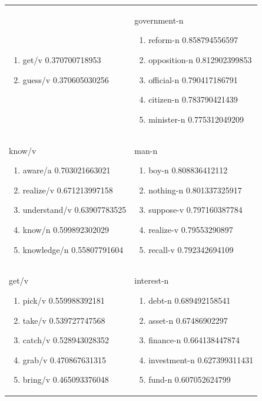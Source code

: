 \documentclass[12pt]{article}
\begin{document}
\begin{longtable}{ p{7cm} | p{7cm} }
\begin{enumerate}
			\item get/v 0.370700718953
			\item guess/v 0.370605030256
		\end{enumerate} &
		government-n
		\begin{enumerate}
			\item reform-n 0.858794556597
			\item opposition-n 0.812902399853
			\item official-n 0.790417186791
			\item citizen-n 0.783790421439
			\item minister-n 0.775312049209
		\end{enumerate}
		\\
		know/v
		\begin{enumerate}
			\item aware/a 0.703021663021
			\item realize/v 0.671213997158
			\item understand/v 0.63907783525
			\item know/n 0.599892302029
			\item knowledge/n 0.55807791604
		\end{enumerate} &
		man-n
		\begin{enumerate}
			\item boy-n 0.808836412112
			\item nothing-n 0.801337325917
			\item suppose-v 0.797160387784
			\item realize-v 0.79553290897
			\item recall-v 0.792342694109
		\end{enumerate}
		\\
		get/v
		\begin{enumerate}
			\item pick/v 0.559988392181
			\item take/v 0.539727747568
			\item catch/v 0.528943028352
			\item grab/v 0.470867631315
			\item bring/v 0.465093376048
		\end{enumerate} &
		interest-n
		\begin{enumerate}
			\item debt-n 0.689492158541
			\item asset-n 0.67486902297
			\item finance-n 0.664138447874
			\item investment-n 0.627399311431
			\item fund-n 0.607052624799
		\end{enumerate}
		\\


\end{longtable}
\end{document}
